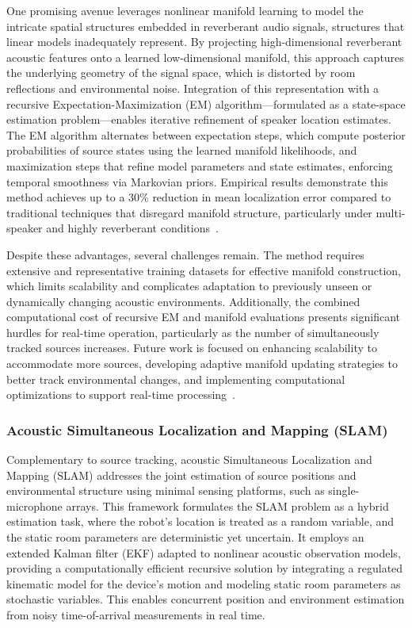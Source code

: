 \documentclass[sigconf]{acmart}
\begin{document}
One promising avenue leverages nonlinear manifold learning to model the intricate spatial structures embedded in reverberant audio signals, structures that linear models inadequately represent. By projecting high-dimensional reverberant acoustic features onto a learned low-dimensional manifold, this approach captures the underlying geometry of the signal space, which is distorted by room reflections and environmental noise. Integration of this representation with a recursive Expectation-Maximization (EM) algorithm—formulated as a state-space estimation problem—enables iterative refinement of speaker location estimates. The EM algorithm alternates between expectation steps, which compute posterior probabilities of source states using the learned manifold likelihoods, and maximization steps that refine model parameters and state estimates, enforcing temporal smoothness via Markovian priors. Empirical results demonstrate this method achieves up to a 30\% reduction in mean localization error compared to traditional techniques that disregard manifold structure, particularly under multi-speaker and highly reverberant conditions~\cite{ref38}.

Despite these advantages, several challenges remain. The method requires extensive and representative training datasets for effective manifold construction, which limits scalability and complicates adaptation to previously unseen or dynamically changing acoustic environments. Additionally, the combined computational cost of recursive EM and manifold evaluations presents significant hurdles for real-time operation, particularly as the number of simultaneously tracked sources increases. Future work is focused on enhancing scalability to accommodate more sources, developing adaptive manifold updating strategies to better track environmental changes, and implementing computational optimizations to support real-time processing~\cite{ref38}.

\subsubsection{Acoustic Simultaneous Localization and Mapping (SLAM)}

Complementary to source tracking, acoustic Simultaneous Localization and Mapping (SLAM) addresses the joint estimation of source positions and environmental structure using minimal sensing platforms, such as single-microphone arrays. This framework formulates the SLAM problem as a hybrid estimation task, where the robot's location is treated as a random variable, and the static room parameters are deterministic yet uncertain. It employs an extended Kalman filter (EKF) adapted to nonlinear acoustic observation models, providing a computationally efficient recursive solution by integrating a regulated kinematic model for the device’s motion and modeling static room parameters as stochastic variables. This enables concurrent position and environment estimation from noisy time-of-arrival measurements in real time.
\end{document}
